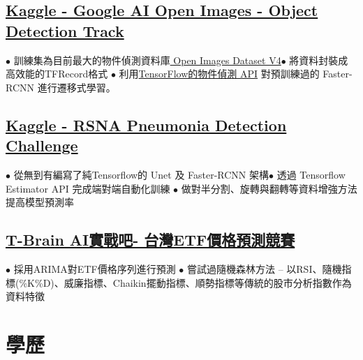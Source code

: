 \documentclass[11pt,a4paper]{moderncv}
\begin{document}
\subsection{\href{https://www.kaggle.com/c/google-ai-open-images-object-detection-track}{Kaggle - Google AI Open Images - Object Detection Track}}
{\footnotesize{$\bullet$ 訓練集為目前最大的物件偵測資料庫\href{https://storage.googleapis.com/openimages/web/index.html}{ Open Images Dataset V4}\space\space $\bullet$ 將資料封裝成高效能的TFRecord格式
\newline $\bullet$ 利用\href{https://github.com/tensorflow/models/tree/master/research/object_detection}{TensorFlow的物件偵測 API} 對預訓練過的 Faster-RCNN 進行遷移式學習。}}

\subsection{\href{https://www.kaggle.com/c/rsna-pneumonia-detection-challenge}{Kaggle - RSNA Pneumonia Detection Challenge}}
{\footnotesize{$\bullet$ 從無到有編寫了純Tensorflow的 Unet 及 Faster-RCNN 架構\space\space $\bullet$ 透過 Tensorflow Estimator API 完成端對端自動化訓練
\newline $\bullet$ 做對半分割、旋轉與翻轉等資料增強方法提高模型預測率}}

\subsection{\href{https://tbrain.trendmicro.com.tw/Competitions/Details/2}{T-Brain AI實戰吧- 台灣ETF價格預測競賽}}
{\footnotesize{$\bullet$ 採用ARIMA對ETF價格序列進行預測 \space\space $\bullet$ 嘗試過隨機森林方法 -- 以RSI、隨機指標(\%K\%D)、威廉指標、Chaikin擺動指標、順勢指標等傳統的股市分析指數作為資料特徵}}
\vspace{-0.6\baselineskip}

\section{學歷}
\vspace{-0.6\baselineskip}
\end{document}
